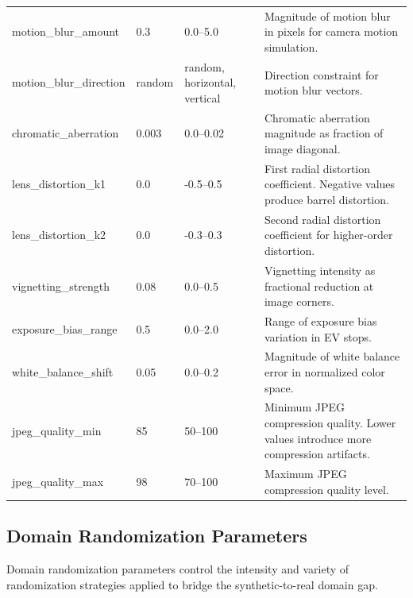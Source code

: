 \begin{longtable}{p{3.5cm}p{2cm}p{2.5cm}p{5.5cm}}
\addlinespace
motion\_blur\_amount & 0.3 & 0.0--5.0 & Magnitude of motion blur in pixels for camera motion simulation. \\
\addlinespace
motion\_blur\_direction & random & random, horizontal, vertical & Direction constraint for motion blur vectors. \\
\addlinespace
chromatic\_aberration & 0.003 & 0.0--0.02 & Chromatic aberration magnitude as fraction of image diagonal. \\
\addlinespace
lens\_distortion\_k1 & 0.0 & -0.5--0.5 & First radial distortion coefficient. Negative values produce barrel distortion. \\
\addlinespace
lens\_distortion\_k2 & 0.0 & -0.3--0.3 & Second radial distortion coefficient for higher-order distortion. \\
\addlinespace
vignetting\_strength & 0.08 & 0.0--0.5 & Vignetting intensity as fractional reduction at image corners. \\
\addlinespace
exposure\_bias\_range & 0.5 & 0.0--2.0 & Range of exposure bias variation in EV stops. \\
\addlinespace
white\_balance\_shift & 0.05 & 0.0--0.2 & Magnitude of white balance error in normalized color space. \\
\addlinespace
jpeg\_quality\_min & 85 & 50--100 & Minimum JPEG compression quality. Lower values introduce more compression artifacts. \\
\addlinespace
jpeg\_quality\_max & 98 & 70--100 & Maximum JPEG compression quality level. \\
\end{longtable}

\subsection{Domain Randomization Parameters}

Domain randomization parameters control the intensity and variety of randomization strategies applied to bridge the synthetic-to-real domain gap.

